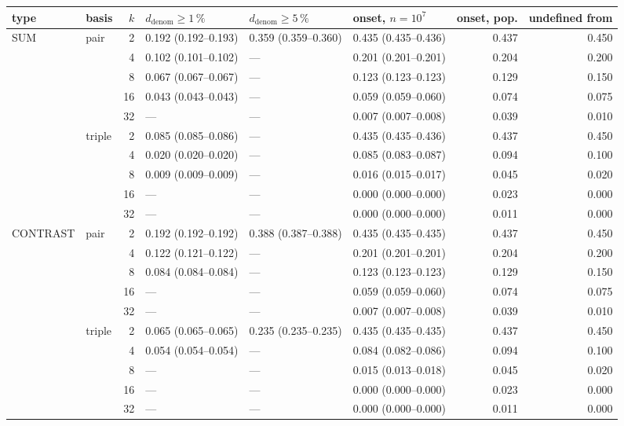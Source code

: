 \scriptsize\setlength{\tabcolsep}{4pt}
\begin{tabular}{llrlllrr}
\toprule
type & basis & $k$ & $d_{\mathrm{denom}}\geq 1\,\%$ & $d_{\mathrm{denom}}\geq 5\,\%$ & onset, $n=10^7$ & onset, pop. & undefined from \\
\midrule
SUM & pair & 2 & 0.192 (0.192--0.193) & 0.359 (0.359--0.360) & 0.435 (0.435--0.436) & 0.437 & 0.450 \\
 &  & 4 & 0.102 (0.101--0.102) & --- & 0.201 (0.201--0.201) & 0.204 & 0.200 \\
 &  & 8 & 0.067 (0.067--0.067) & --- & 0.123 (0.123--0.123) & 0.129 & 0.150 \\
 &  & 16 & 0.043 (0.043--0.043) & --- & 0.059 (0.059--0.060) & 0.074 & 0.075 \\
 &  & 32 & --- & --- & 0.007 (0.007--0.008) & 0.039 & 0.010 \\
 & triple & 2 & 0.085 (0.085--0.086) & --- & 0.435 (0.435--0.436) & 0.437 & 0.450 \\
 &  & 4 & 0.020 (0.020--0.020) & --- & 0.085 (0.083--0.087) & 0.094 & 0.100 \\
 &  & 8 & 0.009 (0.009--0.009) & --- & 0.016 (0.015--0.017) & 0.045 & 0.020 \\
 &  & 16 & --- & --- & 0.000 (0.000--0.000) & 0.023 & 0.000 \\
 &  & 32 & --- & --- & 0.000 (0.000--0.000) & 0.011 & 0.000 \\
\midrule
CONTRAST & pair & 2 & 0.192 (0.192--0.192) & 0.388 (0.387--0.388) & 0.435 (0.435--0.435) & 0.437 & 0.450 \\
 &  & 4 & 0.122 (0.121--0.122) & --- & 0.201 (0.201--0.201) & 0.204 & 0.200 \\
 &  & 8 & 0.084 (0.084--0.084) & --- & 0.123 (0.123--0.123) & 0.129 & 0.150 \\
 &  & 16 & --- & --- & 0.059 (0.059--0.060) & 0.074 & 0.075 \\
 &  & 32 & --- & --- & 0.007 (0.007--0.008) & 0.039 & 0.010 \\
 & triple & 2 & 0.065 (0.065--0.065) & 0.235 (0.235--0.235) & 0.435 (0.435--0.435) & 0.437 & 0.450 \\
 &  & 4 & 0.054 (0.054--0.054) & --- & 0.084 (0.082--0.086) & 0.094 & 0.100 \\
 &  & 8 & --- & --- & 0.015 (0.013--0.018) & 0.045 & 0.020 \\
 &  & 16 & --- & --- & 0.000 (0.000--0.000) & 0.023 & 0.000 \\
 &  & 32 & --- & --- & 0.000 (0.000--0.000) & 0.011 & 0.000 \\
\bottomrule
\end{tabular}
